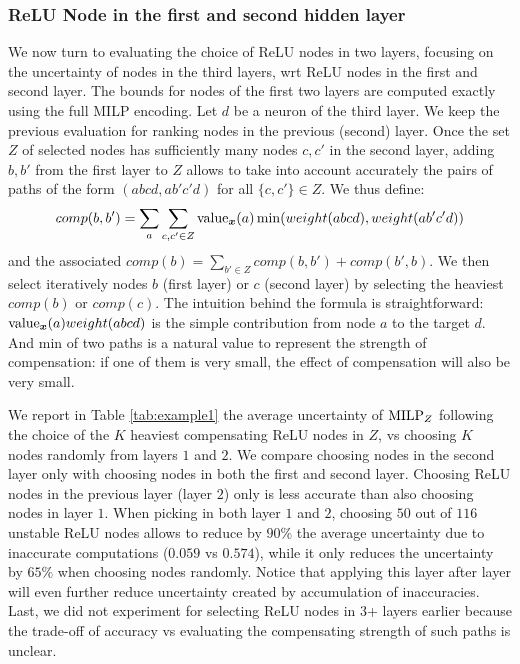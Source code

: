 \subsubsection*{ReLU Node in the first and second hidden layer}

We now turn to evaluating the choice of ReLU nodes in two layers, focusing on the uncertainty of nodes in the third layers, wrt ReLU nodes in the first and second layer.
The bounds for nodes of the first two layers are computed exactly using the full MILP encoding. Let $d$ be a neuron of the third layer.
We keep the previous evaluation for ranking nodes in the previous (second) layer. 
Once the set $Z$ of selected nodes has sufficiently many nodes $c,c'$ in the second layer, adding $b,b'$ from the first layer to $Z$ allows to take into account accurately the pairs of paths of the form $(a b c d, a b' c' d)$ for all $\{c,c'\} \in Z$. We thus define:
$$comp(b,b')=\sum_a \sum_{c,c' \in Z} {\textrm{value}}_{\boldsymbol{x}}(a) \min( weight(abcd),weight(ab'c'd))$$ and the associated $comp(b)=\sum_{b' \in Z} comp(b,b') + comp(b',b)$. We then select iteratively nodes $b$ (first layer) or $c$ (second layer) by selecting the heaviest $comp(b)$ or $comp(c)$. {\color{red} The intuition behind the formula is straightforward: ${\textrm{value}}_{\boldsymbol{x}}(a)weight(abcd)$ is the simple contribution from node $a$ to the target $d$. And min of two paths is a natural value to represent the strength of compensation: if one of them is very small, the effect of compensation will also be very small.}

We report in Table \ref{tab:example1} the average uncertainty of ${\textrm{MILP}}_Z$ following the choice of the $K$ heaviest compensating ReLU nodes in $Z$, vs choosing $K$ nodes randomly from layers $1$ and $2$. 
We compare choosing nodes in the second layer only with choosing nodes in both the first and second layer.
Choosing ReLU nodes in the previous layer (layer $2$) only is less accurate than 
also choosing nodes in layer $1$. When picking in both layer $1$ and $2$, choosing $50$ out of $116$ unstable ReLU nodes allows to reduce by $90\%$ the average uncertainty due to inaccurate computations ($0.059$ vs $0.574$), while it only reduces the uncertainty by $65\%$ when choosing nodes randomly. Notice that applying this layer after layer will even further reduce uncertainty created by accumulation of inaccuracies. 
Last, we did not experiment for selecting ReLU nodes in 3+ layers earlier because the trade-off of accuracy vs evaluating the compensating strength of such paths is unclear.

